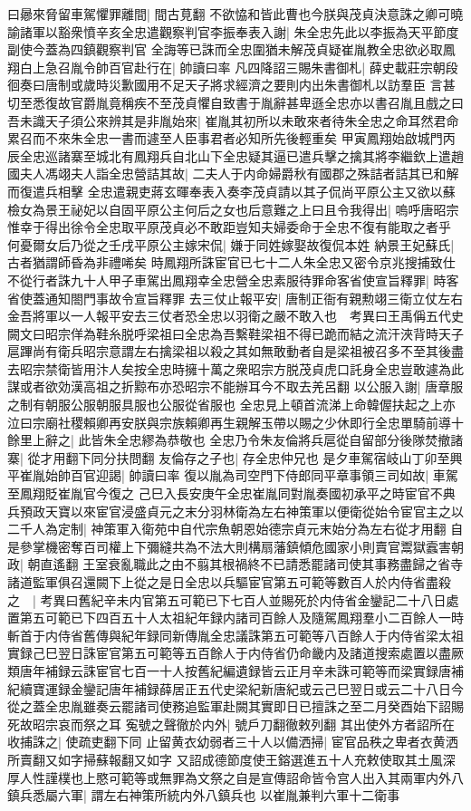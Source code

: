 曰曏來脅留車駕懼罪離間|{
	間古莧翻}
不欲恊和皆此曹也今朕與茂貞決意誅之卿可曉諭諸軍以豁衆憤辛亥全忠遣觀察判官李振奉表入謝|{
	朱全忠先此以李振為天平節度副使今蓋為四鎮觀察判官}
全誨等已誅而全忠圍猶未解茂貞疑崔胤教全忠欲必取鳳翔白上急召胤令帥百官赴行在|{
	帥讀曰率}
凡四降詔三賜朱書御札|{
	薛史載莊宗朝段徊奏曰唐制或歲時災歉國用不足天子將求經濟之要則内出朱書御札以訪羣臣}
言甚切至悉復故官爵胤竟稱疾不至茂貞懼自致書于胤辭甚卑遜全忠亦以書召胤且戲之曰吾未識天子須公來辨其是非胤始來|{
	崔胤其初所以未敢來者待朱全忠之命耳然君命累召而不來朱全忠一書而遽至人臣事君者必知所先後輕重矣}
甲寅鳳翔始啟城門丙辰全忠巡諸寨至城北有鳳翔兵自北山下全忠疑其逼已遣兵擊之擒其將李繼欽上遣趙國夫人馮翊夫人詣全忠營詰其故|{
	二夫人于内命婦爵秋有國郡之殊詰者詰其已和解而復遣兵相擊}
全忠遣親吏蔣玄暉奉表入奏李茂貞請以其子侃尚平原公主又欲以蘇檢女為景王祕妃以自固平原公主何后之女也后意難之上曰且令我得出|{
	嗚呼唐昭宗惟幸于得出徐令全忠取平原茂貞必不敢距豈知夫婦委命于全忠不復有能取之者乎}
何憂爾女后乃從之壬戌平原公主嫁宋侃|{
	嫌于同姓嫁娶故復侃本姓}
納景王妃蘇氏|{
	古者猶謂師昏為非禮唏矣}
時鳳翔所誅宦官已七十二人朱全忠又密令京兆搜捕致仕不從行者誅九十人甲子車駕出鳳翔幸全忠營全忠素服待罪命客省使宣旨釋罪|{
	時客省使蓋通知閤門事故令宣旨釋罪}
去三仗止報平安|{
	唐制正衙有親勲翊三衛立仗左右金吾將軍以一人報平安去三仗者恐全忠以羽衛之嚴不敢入也　考異曰王禹偁五代史闕文曰昭宗佯為鞋糸脱呼梁祖曰全忠為吾繫鞋梁祖不得已跪而結之流汗浹背時天子扈蹕尚有衛兵昭宗意謂左右擒梁祖以殺之其如無敢動者自是梁祖被召多不至其後盡去昭宗禁衛皆用汴人矣按全忠時擁十萬之衆昭宗方脱茂貞虎口託身全忠豈敢遽為此謀或者欲効漢高祖之折黥布亦恐昭宗不能辦耳今不取去羌呂翻}
以公服入謝|{
	唐章服之制有朝服公服朝服具服也公服從省服也}
全忠見上頓首流涕上命韓偓扶起之上亦泣曰宗廟社稷賴卿再安朕與宗族賴卿再生親解玉帶以賜之少休即行全忠單騎前導十餘里上辭之|{
	此皆朱全忠繆為恭敬也}
全忠乃令朱友倫將兵扈從自留部分後隊焚撤諸寨|{
	從才用翻下同分扶問翻}
友倫存之子也|{
	存全忠仲兄也}
是夕車駕宿岐山丁卯至興平崔胤始帥百官迎謁|{
	帥讀曰率}
復以胤為司空門下侍郎同平章事領三司如故|{
	車駕至鳳翔貶崔胤官今復之}
己巳入長安庚午全忠崔胤同對胤奏國初承平之時宦官不典兵預政天寶以來宦官浸盛貞元之末分羽林衛為左右神策軍以便衛從始令宦官主之以二千人為定制|{
	神策軍入衛苑中自代宗魚朝恩始德宗貞元末始分為左右從才用翻}
自是參掌機密奪百司權上下彌縫共為不法大則構扇藩鎮傾危國家小則賣官鬻獄蠧害朝政|{
	朝直遙翻}
王室衰亂職此之由不翦其根禍終不已請悉罷諸司使其事務盡歸之省寺諸道監軍俱召還闕下上從之是日全忠以兵驅宦官第五可範等數百人於内侍省盡殺之　|{
	考異曰舊紀辛未内官第五可範已下七百人並賜死於内侍省金鑾記二十八日處置第五可範已下四百五十人太祖紀年録内諸司百餘人及隨駕鳳翔羣小二百餘人一時斬首于内侍省舊傳與紀年録同新傳胤全忠議誅第五可範等八百餘人于内侍省梁太祖實録己巳翌日誅宦官第五可範等五百餘人于内侍省仍命畿内及諸道搜索處置以盡厥類唐年補録云誅宦官七百一十人按舊紀編遺録皆云正月辛未誅可範等而梁實録唐補紀續寶運録金鑾記唐年補録薛居正五代史梁紀新唐紀或云己巳翌日或云二十八日今從之蓋全忠胤雖奏云罷諸司使務追監軍赴闕其實即日已擅誅之至二月癸酉始下詔賜死故昭宗哀而祭之耳}
寃號之聲徹於内外|{
	號戶刀翻徹敕列翻}
其出使外方者詔所在收捕誅之|{
	使疏吏翻下同}
止留黄衣幼弱者三十人以備洒掃|{
	宦官品秩之卑者衣黄洒所賣翻又如字掃蘇報翻又如字}
又詔成德節度使王鎔選進五十人充敕使取其土風深厚人性謹樸也上愍可範等或無罪為文祭之自是宣傳詔命皆令宫人出入其兩軍内外八鎮兵悉屬六軍|{
	謂左右神策所統内外八鎮兵也}
以崔胤兼判六軍十二衛事

